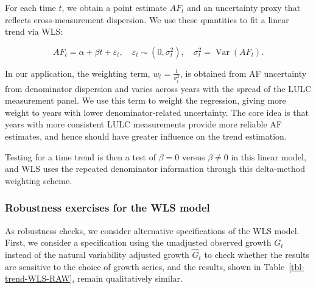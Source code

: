 \documentclass[
  12pt,
  letterpaper,
  DIV=11,
  numbers=noendperiod]{scrartcl}
\begin{document}
For each time \(t\), we obtain a point estimate \(AF_t\) and an
uncertainty proxy that reflects cross-measurement dispersion. We use
these quantities to fit a linear trend via WLS:

\[
AF_t = \alpha + \beta t + \varepsilon_t, \quad \varepsilon_t \sim (0, \sigma_t^2), \quad \sigma_t^2 = \operatorname{Var}(AF_t).
\]

In our application, the weighting term, \(w_t=\frac{1}{\sigma_t^2}\), is
obtained from AF uncertainty from denominator dispersion and varies
across years with the spread of the LULC measurement panel. We use this
term to weight the regression, giving more weight to years with lower
denominator-related uncertainty. The core idea is that years with more
consistent LULC measurements provide more reliable AF estimates, and
hence should have greater influence on the trend estimation.

Testing for a time trend is then a test of \(\beta=0\) versus
\(\beta\neq 0\) in this linear model, and WLS uses the repeated
denominator information through this delta-method weighting scheme.

\subsubsection*{Robustness exercises for the WLS
model}\label{robustness-exercises-for-the-wls-model}

As robustness checks, we consider alternative specifications of the WLS
model. First, we consider a specification using the unadjusted observed
growth \(G_t\) instead of the natural variability adjusted growth
\(\hat{G}_t\) to check whether the results are sensitive to the choice
of growth series, and the results, shown in
Table~\ref{tbl-trend-WLS-RAW}, remain qualitatively similar.
\end{document}
